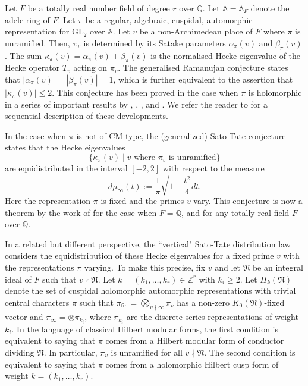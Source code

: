 \documentclass[reqno]{amsart}
\theoremstyle{plain}
\theoremstyle{definition}
\theoremstyle{remark}
\def\Q{\mathbb{Q}}
\def\GL{\mathrm{GL}}
\def\A{\mathbbm A}
\def\Z{\mathbb Z}
\def\Q{\mathbb Q}
\def\A{\mathbb A}
\begin{document}
Let $F$ be a totally real number field of degree $r$ over $\Q$. Let $\A = \A_F$ denote the adele ring of $F$. Let $\pi$ be a regular, algebraic, cuspidal, automorphic representation for $\GL_2$ over $\A$. Let $v$ be a non-Archimedean place of $F$ where $\pi$ is unramified. Then, $\pi_v$ is determined by its Satake parameters $\alpha_{\pi} (v)$ and $\beta_{\pi} (v)$. The sum $\kappa_\pi (v) = \alpha_{\pi} (v) + \beta_{\pi} (v)$ is the normalised Hecke eigenvalue of the Hecke operator $T_v$ acting on $\pi_v$. The generalised Ramanujan conjecture states that $|\alpha_{\pi} (v)| = |\beta_{\pi} (v)| = 1$, which is further equivalent to the assertion that $|\kappa_\pi (v)| \leq  2$. This conjecture has been proved in the case when $\pi$ is holomorphic in a series of important results by \cite{Deligne}, \cite{Deligne-Serre}, \cite{Brylinski-Labesse}, \cite{Blasius} and \cite{Nguyen}.  We refer the reader to \cite{Li-2009} for a sequential description of these developments.    

In the case when $\pi$ is not of CM-type, the (generalized) Sato-Tate conjecture states that the Hecke eigenvalues 
$$
\{ \kappa_\pi (v) \mid v \textrm{ where } \pi_v \textrm{ is unramified}\}
$$
are equidistributed in the interval $[-2,2]$ with respect to the measure 
$$d\mu_{\infty}(t) := \frac{1}{\pi}\sqrt{1 - \frac{t^2}{4}}dt.$$
Here the representation $\pi$ is fixed and the primes $v$ vary.  This conjecture is now a theorem by the work of \cite{BGHT} for the case when $F = \Q$, and \cite{BGG} for any totally real field $F$ over $\Q$.  

In a related but different perspective, the ``vertical" Sato-Tate distribution law considers the equidistribution of these Hecke eigenvalues for a fixed prime $v$ with the representations $\pi$ varying. To make this precise, fix $v$ and let $\mathfrak N$ be an integral ideal of $F$ such that $ v  \nmid \mathfrak N$. Let $k = (k_1, \dots, k_r) \in \Z^r$ with $k_i \ge 2$. Let $\Pi_k (\mathfrak N)$ denote the set of cuspidal holomorphic automorphic representations with trivial central characters $\pi$ such that $\pi_{\mathrm{fin}} = \bigotimes_{v \nmid \infty} \pi_v$ has a non-zero $K_0 (\mathfrak N)$-fixed vector and $\pi_\infty = \otimes \pi_{k_i}$, where $\pi_{k_i}$ are the discrete series representations of weight $k_i$. In the language of classical Hilbert modular forms, the first condition is equivalent to saying that $\pi$ comes from a Hilbert modular form of conductor dividing $\mathfrak{N}$. In particular, $\pi_v$ is unramified for all $v \nmid \mathfrak N$. The second condition is equivalent to saying that $\pi$ comes from a holomorphic Hilbert cusp form of weight $k = (k_1, \dots, k_r)$. 
\end{document}
